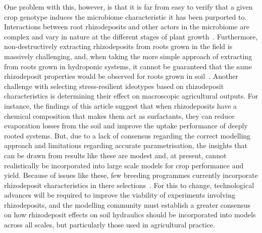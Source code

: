 \documentclass[11pt,a4paper]{article}
\numberwithin{equation}{section}
\begin{document}
One problem with this, however, is that it is far from easy to verify that a given crop genotype induces the microbiome characteristic it has been purported to. Interactions between root rhizodeposits and other actors in the microbiome are complex and vary in nature at the different stages of plant growth~\citep{bakker2012harnessing,oburger2018sampling}. Furthermore, non-destructively extracting rhizodeposits from roots grown in the field is massively challenging, and, when taking the more simple approach of extracting from roots grown in hydroponic systems, it cannot be guaranteed that the same rhizodeposit properties would be observed for roots grown in soil~\citep{oburger2018sampling}. Another challenge with selecting stress-resilient ideotypes based on rhizodeposit characteristics is determining their effect on macroscopic agricultural outputs. For instance, the findings of this article suggest that when rhizodeposits have a chemical composition that makes them act as surfactants, they can reduce evaporation losses from the soil and improve the uptake performance of deeply rooted systems. But, due to a lack of consensus regarding the correct modelling approach and limitations regarding accurate parametrisation, the insights that can be drawn from results like these are modest and, at present, cannot realistically be incorporated into large scale models for crop performance and yield. Because of issues like these, few breeding programmes currently incorporate rhizodeposit characteristics in there selections~\citep{preece2020return}. For this to change, technological advances will be required to improve the viability of experiments involving rhizodeposits, and the modelling community must establish a greater consensus on how rhizodeposit effects on soil hydraulics should be incorporated into models across all scales, but particularly those used in agricultural practice.

%



\end{document}
